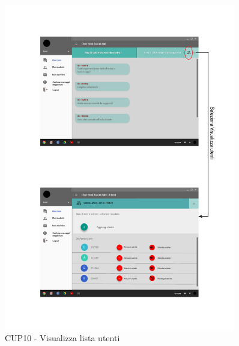 \begin{figure}
	\centering
	\includegraphics[width=0.9\textwidth]{imgs/gruppo6/activities/act_cup10_visualizza_lista_utenti.pdf}
	\caption{CUP10 - Visualizza lista utenti}
	\label{fig:cup10}
\end{figure}

